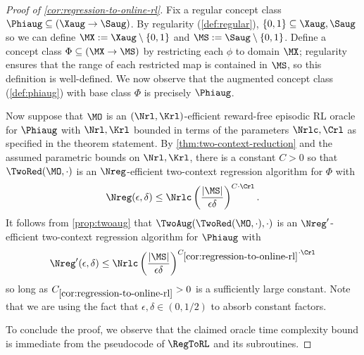 \begin{proof}[Proof of \cref{cor:regression-to-online-rl}]
Fix a regular concept class $\Phiaug \subseteq (\Xaug\to\Saug)$. By regularity (\cref{def:regular}), $\{0,1\} \subseteq \Xaug,\Saug$ so we can define $\MX := \Xaug \setminus \{0,1\}$ and $\MS := \Saug \setminus \{0,1\}$. Define a concept class $\Phi \subseteq (\MX \to \MS)$ by restricting each $\phi$ to domain $\MX$; regularity ensures that the range of each restricted map is contained in $\MS$, so this definition is well-defined. We now observe that the augmented concept class (\cref{def:phiaug}) with base class $\Phi$ is precisely $\Phiaug$.

Now suppose that $\MO$ is an $(\Nrl,\Krl)$-efficient reward-free episodic RL oracle for $\Phiaug$ with $\Nrl,\Krl$ bounded in terms of the parameters $\Nrlc,\Crl$ as specified in the theorem statement. By \cref{thm:two-context-reduction} and the assumed parametric bounds on $\Nrl,\Krl$, there is a constant $C>0$ so that $\TwoRed(\MO,\cdot)$ is an $\Nreg$-efficient two-context regression algorithm for $\Phi$ with
\[\Nreg(\epsilon,\delta) \leq \Nrlc\left(\frac{|\MS|}{\epsilon\delta}\right)^{C \cdot \Crl}.\]
It follows from \cref{prop:twoaug} that $\TwoAug(\TwoRed(\MO,\cdot),\cdot)$ is an $\Nreg'$-efficient two-context regression algorithm for $\Phiaug$ with 
\[\Nreg'(\epsilon,\delta) \leq \Nrlc \left(\frac{|\MS|}{\epsilon\delta}\right)^{C_{\ref{cor:regression-to-online-rl}} \cdot \Crl}\]
so long as $C_{\ref{cor:regression-to-online-rl}}>0$ is a sufficiently large constant. Note that we are using the fact that $\epsilon,\delta \in (0,1/2)$ to absorb constant factors.

To conclude the proof, we observe that the claimed oracle time complexity bound is immediate from the pseudocode of $\RegToRL$ and its subroutines.
\end{proof}
